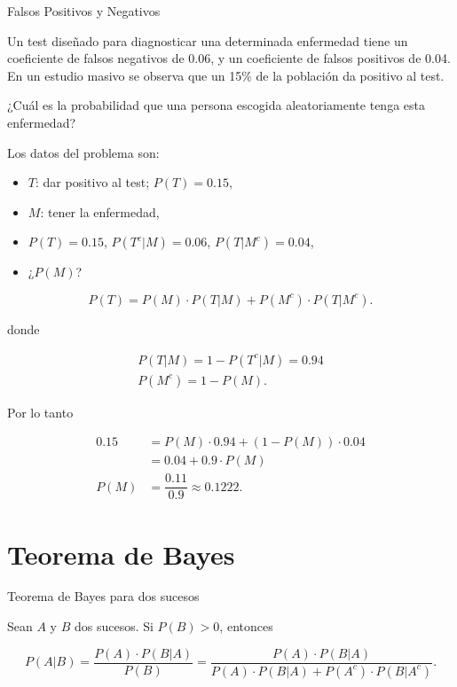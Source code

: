 \documentclass[
  letterpaper,
  DIV=11,
  numbers=noendperiod]{scrreprt}
\providecommand{\tightlist}{%
  \setlength{\itemsep}{0pt}\setlength{\parskip}{0pt}}\usepackage{longtable,booktabs,array}
\begin{document}
\begin{Ejemplo}{Falsos Positivos y Negativos}{}

Un test diseñado para diagnosticar una determinada enfermedad tiene un
coeficiente de falsos negativos de 0.06, y un coeficiente de falsos
positivos de 0.04. En un estudio masivo se observa que un 15\% de la
población da positivo al test.

¿Cuál es la probabilidad que una persona escogida aleatoriamente tenga
esta enfermedad?

Los datos del problema son:

\begin{itemize}
\tightlist
\item
  \(T\): dar positivo al test; \(P(T)=0.15\),
\item
  \(M\): tener la enfermedad,
\item
  \(P(T)=0.15\), \(P(T^c|M)=0.06\), \(P(T|M^c)=0.04\),
\item
  ¿\(P(M)\)?
\end{itemize}

\[
P(T) =P(M)\cdot P(T|M)+P(M^c)\cdot P(T|M^c).
\]

donde

\[
\begin{array}{l}
P(T|M)=1-P(T^c|M)=0.94 \\
P(M^c)=1-P(M).
\end{array}
\]

Por lo tanto

\[
\begin{array}{rl}
0.15 & = P(M)\cdot 0.94+(1-P(M))\cdot 0.04\\
 & =0.04+0.9\cdot P(M)\\
P(M) & =\dfrac{0.11}{0.9}\approx 0.1222.
\end{array}
\]

\end{Ejemplo}

\section{Teorema de Bayes}\label{teorema-de-bayes}

\begin{Teorema}{Teorema de Bayes para dos sucesos}{}

Sean \(A\) y \(B\) dos sucesos. Si \(P(B)>0\), entonces

\[
P(A|B) =\dfrac{P(A)\cdot P(B|A)}{P(B)}=\dfrac{P(A)\cdot P(B|A)}{P(A)\cdot P(B|A)+P(A^c)\cdot P(B|A^c)}.
\]

\end{Teorema}
\end{document}
